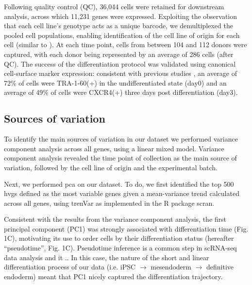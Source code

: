  Following quality control (QC), 36,044 cells were retained for downstream analysis, across which 11,231 genes were expressed.
 Exploiting the observation that each cell line’s genotype acts as a unique barcode, we demultiplexed the pooled cell populations, enabling identification of the cell line of origin for each cell (similar to \cite{kang2018multiplexed}). 
 At each time point, cells from between 104 and 112 donors were captured, with each donor being represented by an average of 286 cells (after QC). 
 The success of the differentiation protocol was validated using canonical cell-surface marker expression: consistent with previous studies \cite{chu2016single}, an average of 72\% of cells were TRA-1-60(+) in the undifferentiated state (day0) and an average of 49\% of cells were CXCR4(+) three days post differentiation (day3).

\subsection{Sources of variation} 

To identify the main sources of variation in our dataset we performed variance component analysis across all genes, using a linear mixed model.
Variance component analysis revealed the time point of collection as the main source of variation, followed by the cell line of origin and the experimental batch. 

Next, we performed \gls{pca} on our dataset.
To do, we first identified the top 500 \gls{hvgs} defined as the most variable genes given a mean-variance trend calculated across all genes, using trenVar as implemented in the R package scran.

Consistent with the results from the variance component analysis, the first principal component (PC1) was strongly associated with differentiation time (Fig. 1C), motivating its use to order cells by their differentiation status (hereafter “pseudotime”, Fig. 1C).
Pseudotime inference is a common step in scRNA-seq data analysis and it ..
In this case, the nature of the short and linear differentiation process of our data (i.e. iPSC $\rightarrow$ mesendoderm $\rightarrow$ definitive endoderm) meant that PC1 nicely captured the differentiation trajectory.

